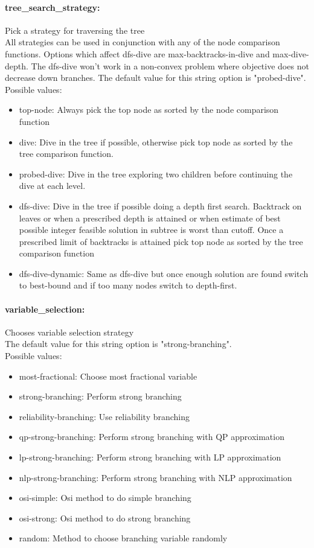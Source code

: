 \paragraph{tree\_search\_strategy:}\label{opt:tree_search_strategy} Pick a strategy for traversing the tree \\
 All strategies can be used in conjunction with any of the node comparison functions. Options which affect dfs-dive are max-backtracks-in-dive and max-dive-depth. The dfs-dive won't work in a non-convex problem where objective does not decrease down branches. The default value for this string option is "probed-dive".
\\ 
Possible values:
\begin{itemize}
   \item top-node:  Always pick the top node as sorted by the node comparison function
   \item dive: Dive in the tree if possible, otherwise pick top node as sorted by the tree comparison function.
   \item probed-dive: Dive in the tree exploring two children before continuing the dive at each level.
   \item dfs-dive: Dive in the tree if possible doing a depth first search. Backtrack on leaves or when a prescribed depth is attained or when estimate of best possible integer feasible solution in subtree is worst than cutoff. Once a prescribed limit of backtracks is attained pick top node as sorted by the tree comparison function
   \item dfs-dive-dynamic: Same as dfs-dive but once enough solution are found switch to best-bound and if too many nodes switch to depth-first.
\end{itemize}

\paragraph{variable\_selection:}\label{opt:variable_selection} Chooses variable selection strategy \\
 The default value for this string option is "strong-branching".
\\ 
Possible values:
\begin{itemize}
   \item most-fractional: Choose most fractional variable
   \item strong-branching: Perform strong branching
   \item reliability-branching: Use reliability branching
   \item qp-strong-branching: Perform strong branching with QP approximation
   \item lp-strong-branching: Perform strong branching with LP approximation
   \item nlp-strong-branching: Perform strong branching with NLP approximation
   \item osi-simple: Osi method to do simple branching
   \item osi-strong: Osi method to do strong branching
   \item random: Method to choose branching variable randomly
\end{itemize}

